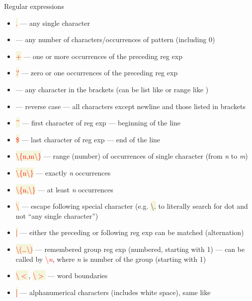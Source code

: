 \documentclass[compress, ucs, xelatex, 11pt, xcolor=svgnames, aspectratio=169,
	hyperref={
		bookmarks=true,
		unicode=true,
		colorlinks=true,
		pdftitle={Linux, command line and MetaCentrum},
		plainpages=false,
		pdfauthor={Vojtech Zeisek},
		pdfsubject={Course about use of Linux command line, writing shell scripts and using MetaCentrum of CESNET},
		pdfcreator={XeLaTeX},
		pdfkeywords={Linux, GNU, BASH, shell, command line, MetaCentrum},
		linkcolor=DarkRed, %
		anchorcolor=DarkBlue, %
		citecolor=Indigo, %
		filecolor=NavyBlue, %
		menucolor=DarkMagenta, %
		urlcolor=DarkBlue, %
		pdftex},
	url={hyphens, lowtilde} %
	]{beamer}
\renewcommand{\texttt}[1]{\colorbox{Beige}{{\ttfamily #1}}}
\renewcommand{\alert}[1]{\textcolor{red}{#1}}
\begin{document}
\begin{frame}[allowframebreaks]{Regular expressions}
	\label{regexp}
	\begin{itemize}
		\item \alert{\texttt{.}} --- any single character
		\item \alert{\texttt{*}} --- any number of characters/occurrences of pattern (including 0)
		\item \alert{\texttt{+}} --- one or more occurrences of the preceding reg exp
		\item \alert{\texttt{?}} --- zero or one occurrences of the preceding reg exp
		\item \alert{\texttt{[\ldots]}} --- any character in the brackets (can be list like \texttt{[abcd]} or range like \texttt{[a-kxz4-8\_-]})
		\item \alert{\texttt{[\textasciicircum\ldots]}} --- reverse case --- all characters except newline and those listed in brackets
		\item \alert{\texttt{\textasciicircum}} --- first character of reg exp --- beginning of the line
		\item \alert{\texttt{\$}} --- last character of reg exp --- end of the line
		\item \alert{\texttt{\textbackslash\{n,m\textbackslash\}}} --- range (number) of occurrences of single character (from \textit{n} to \textit{m})
		\item \alert{\texttt{\textbackslash\{n\textbackslash\}}} --- exactly \textit{n} occurrences
		\item \alert{\texttt{\textbackslash\{n,\textbackslash\}}} --- at least \textit{n} occurrences
		\item \alert{\texttt{\textbackslash}} --- escape following special character (e.g. \texttt{\textbackslash .} to literally search for dot and not \enquote{any single character})
		\item \alert{\texttt{|}} --- either the preceding or following reg exp can be matched (alternation)
		\item \alert{\texttt{\textbackslash(\ldots\textbackslash)}} --- remembered group reg exp (numbered, starting with 1) --- can be called by \alert{\textbackslash\textit{n}}, where \textit{n} is number of the group (starting with 1)
		\item \alert{\texttt{\textbackslash$<$}}, \alert{\texttt{\textbackslash$>$}} --- word boundaries
		\item \alert{\texttt{[[:alnum:]]}} --- alphanumerical characters (includes white space), same like \texttt{[a-zA-Z0-9]}

\end{itemize}
\end{frame}
\end{document}
